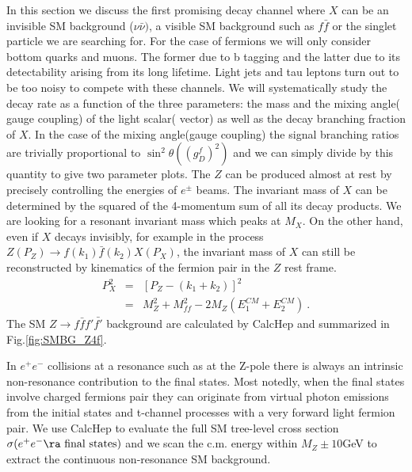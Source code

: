 \documentclass[11pt]{article}
\begin{document}
In this section we discuss the first promising decay channel where $X$ can be an invisible SM background ($\nu \bar{\nu })$, a visible SM background such as $f \bar{f}$ or the singlet particle we are searching for. For the case of fermions we will only consider bottom quarks and muons. The former due to b tagging and the latter due to its detectability arising from its long lifetime. Light jets and tau leptons turn out to be too noisy to compete with these channels.
We will systematically study the decay rate as a function of the three parameters: the mass and the mixing angle( gauge coupling) of the light scalar( vector) as well as the decay branching fraction of $X$. In the case of the mixing angle(gauge coupling) the signal branching ratios are trivially proportional to $\sin ^2 \theta ( (g_D^f)^2 ) $ and we can simply divide by this quantity to give two parameter plots.
The $Z$ can be produced almost at rest by precisely controlling the energies of $e^\pm$ beams.
The invariant mass of $X$ can be determined by the squared of the 4-momentum sum of all its decay products. We are looking for a resonant invariant mass which peaks at $M_X$.
On the other hand, even if $X$ decays invisibly, for example in the process $Z(P_Z)\to f(k_1) \bar{f}(k_2) X(P_X)$, the invariant mass of $X$
can still be  reconstructed by kinematics of the fermion pair in the $Z$ rest frame.
\begin{eqnarray}
P_X^2&=& [P_Z -(k_1+k_2)]^2 \nonumber \\
&=& M_Z^2+ M_{ff}^2 -2M_Z(E^{CM}_1+E^{CM}_2)\ .
\end{eqnarray}
The SM $Z\to f\bar{f}f'\bar{f'}$ background are calculated by CalcHep and summarized in Fig.\ref{fig:SMBG_Z4f}.

  In $e^+e^-$ collisions at a resonance such as at the Z-pole
 there is always an intrinsic non-resonance contribution to the final states.
Most notedly, when the final states involve charged fermions pair they can originate from virtual photon emissions from the initial states and t-channel processes with a very forward light fermion pair.
 We use CalcHep to evaluate the full SM tree-level cross section $\sigma(e^+e^-\ra \mbox{ final states})$ and we scan the c.m. energy
within $M_Z\pm 10$GeV to extract the continuous non-resonance SM background.
\end{document}
